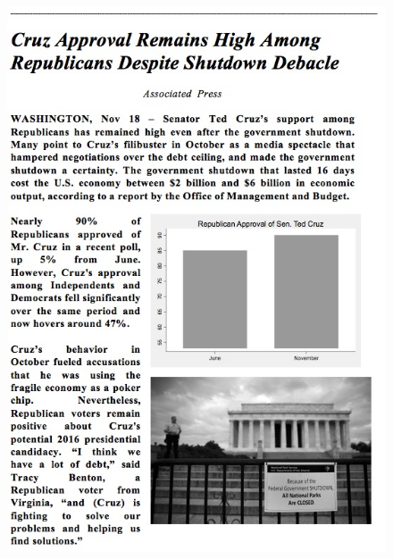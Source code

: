 \documentclass[12pt, letterpaper]{article}
\begin{document}
\begin{figure}[ht]
\begin{minipage}[b]{0.45\linewidth}
\includegraphics[width=1\textwidth]{../figs/mturk_1_treats/Rep_T.jpg}
\label{fig:minipage4}
\end{minipage}
\end{figure}
\end{document}
